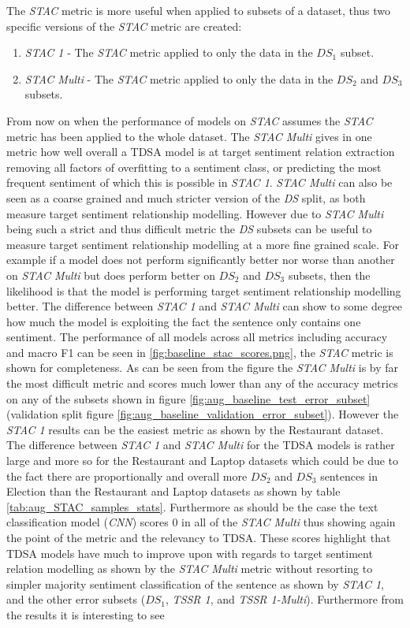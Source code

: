 The \textit{STAC} metric is more useful when applied to subsets of a dataset, thus two specific versions of the \textit{STAC} metric are created:
\begin{enumerate}
    \item \textit{STAC 1} - The \textit{STAC} metric applied to only the data in the $DS_1$ subset.
    \item \textit{STAC Multi} - The \textit{STAC} metric applied to only the data in the $DS_2$ and $DS_3$ subsets.
\end{enumerate}
From now on when the performance of models on \textit{STAC} assumes the \textit{STAC} metric has been applied to the whole dataset. The \textit{STAC Multi} gives in one metric how well overall a TDSA model is at target sentiment relation extraction removing all factors of overfitting to a sentiment class, or predicting the most frequent sentiment of which this is possible in \textit{STAC 1}. \textit{STAC Multi} can also be seen as a coarse grained and much stricter version of the \textit{DS} split, as both measure target sentiment relationship modelling. However due to \textit{STAC Multi} being such a strict and thus difficult metric the \textit{DS} subsets can be useful to measure target sentiment relationship modelling at a more fine grained scale. For example if a model does not perform significantly better nor worse than another on \textit{STAC Multi} but does perform better on $DS_2$ and $DS_3$ subsets, then the likelihood is that the model is performing target sentiment relationship modelling better. The difference between \textit{STAC 1} and \textit{STAC Multi} can show to some degree how much the model is exploiting the fact the sentence only contains one sentiment. The performance of all models across all metrics including accuracy and macro F1 can be seen in \ref{fig:baseline_stac_scores.png}, the \textit{STAC} metric is shown for completeness. As can be seen from the figure the \textit{STAC Multi} is by far the most difficult metric and scores much lower than any of the accuracy metrics on any of the subsets shown in figure \ref{fig:aug_baseline_test_error_subset} (validation split figure \ref{fig:aug_baseline_validation_error_subset}). However the \textit{STAC 1} results can be the easiest metric as shown by the Restaurant dataset. The difference between \textit{STAC 1} and \textit{STAC Multi} for the TDSA models is rather large and more so for the Restaurant and Laptop datasets which could be due to the fact there are proportionally and overall more $DS_2$ and $DS_3$ sentences in Election than the Restaurant and Laptop datasets as shown by table \ref{tab:aug_STAC_samples_stats}. Furthermore as should be the case the text classification model (\textit{CNN}) scores $0$ in all of the \textit{STAC Multi} thus showing again the point of the metric and the relevancy to TDSA. These scores highlight that TDSA models have much to improve upon with regards to target sentiment relation modelling as shown by the \textit{STAC Multi} metric without resorting to simpler majority sentiment classification of the sentence as shown by \textit{STAC 1}, and the other error subsets ($DS_1$, \textit{TSSR 1}, and \textit{TSSR 1-Multi}). Furthermore from the results it is interesting to see 